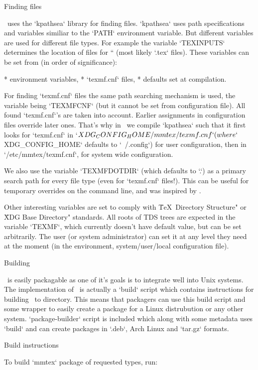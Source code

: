 \sec Finding files

\LuaTeX\ uses the `kpathsea` library for finding files. `kpathsea` uses path
specifications and variables similiar to the `PATH` environment variable. But
different variables are used for different file types. For example the variable
`TEXINPUTS` determines the location of files for `` (most likely `.tex`
files). These variables can be set from (in order of significance):

\begitems
* environment variables,
* `texmf.cnf` files,
* defaults set at compilation.
\enditems

For finding `texmf.cnf` files the same path searching mechanism is used, the
variable being `TEXMFCNF` (but it cannot be set from configuration file). All
found `texmf.cnf`'s are taken into account. Earlier assignments in
configuration files override later ones. That's why in \MMTeX\ we compile
`kpathsea` such that it first looks for `texmf.cnf` in
`$XDG_CONFIG_HOME/mmtex/texmf.cnf` (where `$XDG_CONFIG_HOME` defaults to
`~/.config`) for user configuration, then in `/etc/mmtex/texmf.cnf`, for system
wide configuration.

We also use the variable `TEXMFDOTDIR` (which defaults to `.`) as a primary
search path for every file type (even for `texmf.cnf` files!). This can be
useful for temporary overrides on the command line, and was inspired by
\TeXLive.

Other interesting variables are set to comply with \"\TeX\ Directory Structure"
or \"XDG Base Directory" standards. All roots of TDS trees are expected in the
variable `TEXMF`, which currently doesn't have default value, but can be set
arbitrarily. The user (or system administrator) can set it at any level they
need at the moment (in the environment, system/user/local configuration file).

\sec Building \MMTeX

\MMTeX\ is easily packagable as one of it's goals is to integrate well into
Unix systems. The implementation of \MMTeX\ is actually a `build` script which
contains instructions for building \MMTeX\ to directory. This means that
packagers can use this build script and some wrapper to easily create a package
for a Linux distrubution or any other system. `package-builder` script is
included which along with some metadata uses `build` and can create packages in
`.deb`, Arch Linux and `tar.gz` formats.

\secc Build instructions

To build `mmtex` package of requested types, run:

